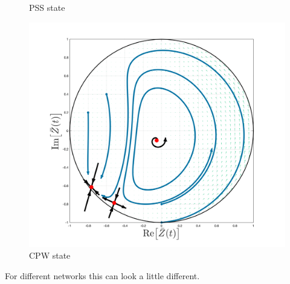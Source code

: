 \begin{figure}[H]
  \caption{PSS state}\label{fig:MFRPSS}
\endminipage\hfill
{}%
  \includegraphics[width=\linewidth, trim={2cm 1cm 2cm 1.5cm },clip]{../Figures/MFRCPW.png}
  \caption{CPW state}\label{fig:MFRCPW}
\endminipage
\end{figure}
For different networks this can look a little different.

